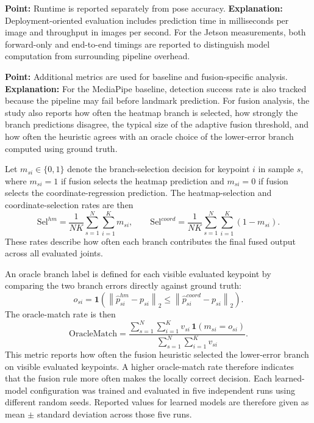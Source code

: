 \documentclass[10pt,letterpaper]{article}
\begin{document}
\medskip
\noindent\textbf{Point:} Runtime is reported separately from pose accuracy.  
\textbf{Explanation:} Deployment-oriented evaluation includes prediction time in milliseconds per image and throughput in images per second. For the Jetson measurements, both forward-only and end-to-end timings are reported to distinguish model computation from surrounding pipeline overhead.

\medskip
\noindent\textbf{Point:} Additional metrics are used for baseline and fusion-specific analysis.  
\textbf{Explanation:} For the MediaPipe baseline, detection success rate is also tracked because the pipeline may fail before landmark prediction. For fusion analysis, the study also reports how often the heatmap branch is selected, how strongly the branch predictions disagree, the typical size of the adaptive fusion threshold, and how often the heuristic agrees with an oracle choice of the lower-error branch computed using ground truth.

Let \(m_{si} \in \{0,1\}\) denote the branch-selection decision for keypoint \(i\) in sample \(s\), where \(m_{si}=1\) if fusion selects the heatmap prediction and \(m_{si}=0\) if fusion selects the coordinate-regression prediction. The heatmap-selection and coordinate-selection rates are then
\begin{equation}
\mathrm{Sel}^{hm} =
\frac{1}{NK}
\sum_{s=1}^{N}\sum_{i=1}^{K} m_{si},
\qquad
\mathrm{Sel}^{coord} =
\frac{1}{NK}
\sum_{s=1}^{N}\sum_{i=1}^{K} (1-m_{si}).
\label{eq:selection-rates}
\end{equation}
These rates describe how often each branch contributes the final fused output across all evaluated joints.

An oracle branch label is defined for each visible evaluated keypoint by comparing the two branch errors directly against ground truth:
\begin{equation}
o_{si} =
\mathbf{1}
\left(
\left\|
\hat{p}^{hm}_{si} - p_{si}
\right\|_2
\le
\left\|
\hat{p}^{coord}_{si} - p_{si}
\right\|_2
\right).
\label{eq:oracle-label}
\end{equation}
The oracle-match rate is then
\begin{equation}
\mathrm{OracleMatch} =
\frac{
\sum_{s=1}^{N}\sum_{i=1}^{K}
v_{si}\,\mathbf{1}(m_{si}=o_{si})
}{
\sum_{s=1}^{N}\sum_{i=1}^{K} v_{si}
}.
\label{eq:oracle-match}
\end{equation}
This metric reports how often the fusion heuristic selected the lower-error branch on visible evaluated keypoints. A higher oracle-match rate therefore indicates that the fusion rule more often makes the locally correct decision.
Each learned-model configuration was trained and evaluated in five independent runs using different random seeds. Reported values for learned models are therefore given as mean \(\pm\) standard deviation across those five runs.
\end{document}
